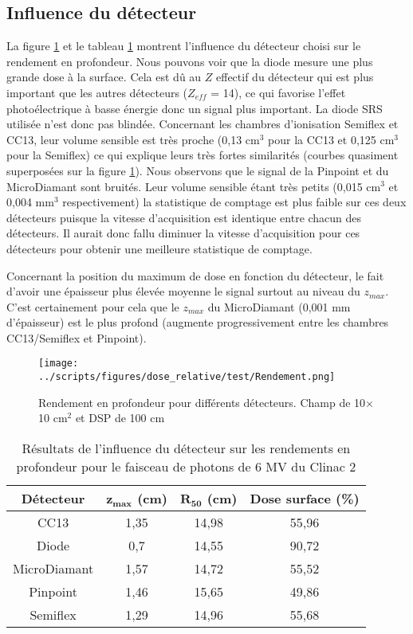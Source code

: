 \documentclass{book}
\begin{document}
\newpage
\subsection{Influence du détecteur}

La figure \ref*{fig_rdt_detecteurs} et le tableau \ref*{table_rdt_detecteurs} montrent l'influence du détecteur choisi sur le rendement en profondeur. Nous pouvons voir que la diode mesure une plus grande dose à la surface. Cela est dû au $Z$ effectif du détecteur qui est plus important que les autres détecteurs ($Z_{eff}$ = 14), ce qui favorise l'effet photoélectrique à basse énergie donc un signal plus important. La diode SRS utilisée n'est donc pas blindée. Concernant les chambres d'ionisation Semiflex et CC13, leur volume sensible est très proche (0,13 cm$^3$ pour la CC13 et 0,125 cm$^3$ pour la Semiflex) ce qui explique leurs très fortes similarités (courbes quasiment superposées sur la figure \ref*{fig_rdt_detecteurs}). Nous observons que le signal de la Pinpoint et du MicroDiamant sont bruités. Leur volume sensible étant très petits (0,015 cm$^3$ et 0,004 mm$^3$ respectivement) la statistique de comptage est plus faible sur ces deux détecteurs puisque la vitesse d'acquisition est identique entre chacun des détecteurs. Il aurait donc fallu diminuer la vitesse d'acquisition pour ces détecteurs pour obtenir une meilleure statistique de comptage.

Concernant la position du maximum de dose en fonction du détecteur, le fait d'avoir une épaisseur plus élevée moyenne le signal surtout au niveau du $z_{max}$. C'est certainement pour cela que le $z_{max}$ du MicroDiamant (0,001 mm d'épaisseur) est le plus profond (augmente progressivement entre les chambres CC13/Semiflex et Pinpoint).

\begin{figure}[h]
  \centering
  \texttt{[image: ../scripts/figures/dose\_relative/test/Rendement.png]}
  \caption{Rendement en profondeur pour différents détecteurs. Champ de 10$\times$10 cm$^2$ et DSP de 100 cm}
  \label{fig_rdt_detecteurs}
\end{figure}

\begin{table}[h]
  \centering
  \begin{tabular}{cccc}
    \toprule
    \textbf{Détecteur} & $\mathbf{z_{max}}$ \textbf{(cm)} & $\mathbf{R_{50}}$ \textbf{(cm)} & \textbf{Dose surface (\%)} \\
    \toprule
    CC13 & 1,35 & 14,98 & 55,96 \\
    Diode & 0,7 & 14,55 & 90,72 \\
    MicroDiamant & 1,57 & 14,72 & 55,52 \\
    Pinpoint & 1,46 & 15,65 & 49,86 \\
    Semiflex & 1,29 & 14,96 & 55,68 \\
    \bottomrule
  \end{tabular}
  \caption{Résultats de l'influence du détecteur sur les rendements en profondeur pour le faisceau de photons de 6 MV du Clinac 2}
  \label{table_rdt_detecteurs}
\end{table}
\end{document}
